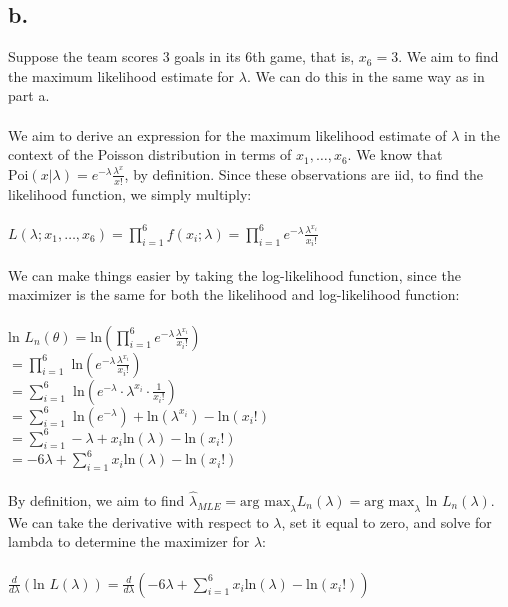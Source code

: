 \documentclass{article}
\newcommand{\1}{\mathbf{1}}
\begin{document}
{\subsection*{b.}
Suppose the team scores 3 goals in its 6th game, that is, $x_6 = 3$. We aim to find the maximum likelihood estimate for $\lambda$. We can do this in the same way as in part a. \\ \\
We aim to derive an expression for the maximum likelihood estimate of $\lambda$ in the context of the Poisson distribution in terms of $x_1, \dots, x_6$. We know that $\text{Poi}(x|\lambda) = e^{-\lambda}\frac{\lambda ^x}{x!}$, by definition. Since these observations are iid, to find the likelihood function, we simply multiply: \\ \\
$L(\lambda; x_1, \dots, x_6) = \prod_{i=1}^{6} f(x_i;\lambda) = \prod_{i=1}^{6} e^{-\lambda} \frac{\lambda^{x_i}}{x_i!} $ \\ \\
We can make things easier by taking the log-likelihood function, since the maximizer is the same for both the likelihood and log-likelihood function: \\ \\
$\text{ln } L_n(\theta) = \text{ln} (\prod_{i=1}^{6} e^{-\lambda} \frac{\lambda^{x_i}}{x_i!}) $ \\
$= \prod_{i=1}^{6} \text{ ln}(e^{-\lambda} \frac{\lambda^{x_i}}{x_i!}) $ \\
$= \sum_{i=1}^{6} \text{ ln}(e^{-\lambda} \cdot \lambda^{x_i} \cdot \frac{1}{x_i!}) $ \\
$= \sum_{i=1}^{6} \text{ ln}(e^{-\lambda}) + \text{ln}(\lambda^{x_i}) - \text{ln}(x_i!) $ \\
$= \sum_{i=1}^{6} -\lambda + x_i\text{ln}(\lambda) - \text{ln}(x_i!) $ \\
$= -6\lambda + \sum_{i=1}^{6} x_i\text{ln}(\lambda) - \text{ln}(x_i!) $ \\ \\
By definition, we aim to find $\widehat{\lambda}_{MLE} = \text{arg max}_{\lambda}L_n(\lambda) = \text{arg max}_{\lambda} \text{ ln }L_n(\lambda)$. We can take the derivative with respect to $\lambda$, set it equal to zero, and solve for lambda to determine the maximizer for $\lambda$: \\ \\
$\frac{d}{d\lambda} (\text{ln } L(\lambda)) = \frac{d}{d\lambda} (-6\lambda + \sum_{i=1}^{6} x_i\text{ln}(\lambda) - \text{ln}(x_i!))$ \\
}
\end{document}
